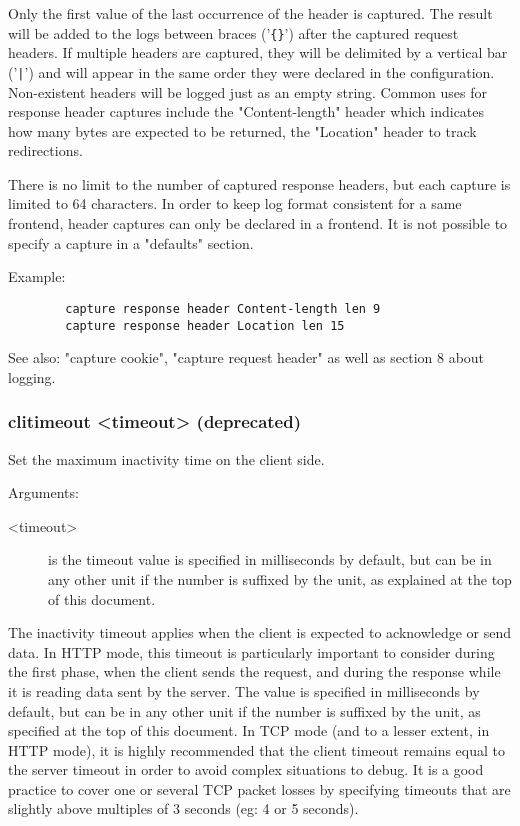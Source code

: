   Only the first value of the last occurrence of the header is captured. The
  result will be added to the logs between braces ('\verb|{}|') after the captured
  request headers. If multiple headers are captured, they will be delimited by
  a vertical bar ('\verb:|:') and will appear in the same order they were declared in
  the configuration. Non-existent headers will be logged just as an empty
  string. Common uses for response header captures include the "Content-length"
  header which indicates how many bytes are expected to be returned, the
  "Location" header to track redirections.

  There is no limit to the number of captured response headers, but each
  capture is limited to 64 characters. In order to keep log format consistent
  for a same frontend, header captures can only be declared in a frontend. It
  is not possible to specify a capture in a "defaults" section.

  Example:
  \begin{verbatim}
        capture response header Content-length len 9
        capture response header Location len 15
  \end{verbatim}

  See also: "capture cookie", "capture request header" as well as section 8
             about logging.

\subsubsection[clitimeout]{clitimeout <timeout> (deprecated)}
  Set the maximum inactivity time on the client side.
  
  
  Arguments:
  \begin{description}
  \item[<timeout>] is the timeout value is specified in milliseconds by default, but
              can be in any other unit if the number is suffixed by the unit,
              as explained at the top of this document.  
  \end{description}

  The inactivity timeout applies when the client is expected to acknowledge or
  send data. In HTTP mode, this timeout is particularly important to consider
  during the first phase, when the client sends the request, and during the
  response while it is reading data sent by the server. The value is specified
  in milliseconds by default, but can be in any other unit if the number is
  suffixed by the unit, as specified at the top of this document. In TCP mode
  (and to a lesser extent, in HTTP mode), it is highly recommended that the
  client timeout remains equal to the server timeout in order to avoid complex
  situations to debug. It is a good practice to cover one or several TCP packet
  losses by specifying timeouts that are slightly above multiples of 3 seconds
  (eg: 4 or 5 seconds).

